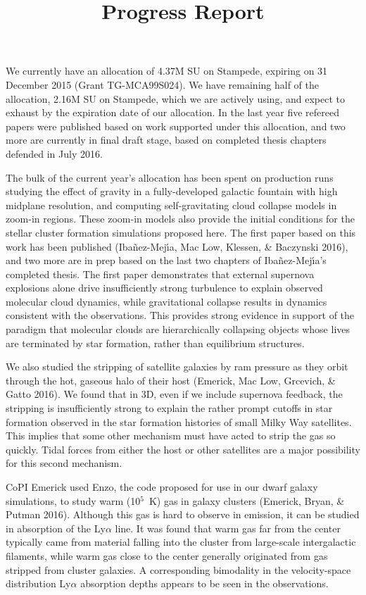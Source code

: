 \documentclass[11pt,preprint]{article}
\title{Progress Report}
\begin{document}
We currently have an allocation of 4.37M SU on Stampede, expiring on 31 December 2015 (Grant TG-MCA99S024).  We have remaining half of the allocation, 2.16M SU on Stampede, which we are actively using, and expect to exhaust by the expiration date of our allocation.  In the last year five refereed papers were published based on work supported under this allocation, and two more are currently in final draft stage, based on completed thesis chapters defended in July 2016.

The bulk of the current year's allocation has been spent on production runs studying the effect of gravity in a fully-developed galactic fountain with high midplane resolution, and computing self-gravitating cloud collapse models in zoom-in regions. These zoom-in models also provide the initial conditions for the stellar cluster formation simulations proposed here. The first paper based on this work has been published (Iba\~nez-Mej\'{\i}a, Mac Low, Klessen, \& Baczynski 2016), and two more are in prep based on the last two chapters of Iba\~nez-Mej\'{\i}a's completed thesis. The first paper demonstrates that external supernova explosions alone drive insufficiently strong turbulence to explain observed molecular cloud dynamics, while gravitational collapse results in dynamics consistent with the observations. This provides strong evidence in support of the paradigm that molecular clouds are hierarchically collapsing objects whose lives are terminated by star formation, rather than equilibrium structures.  

We also studied the stripping of satellite galaxies by ram pressure as they orbit through the hot, gaseous halo of their host (Emerick, Mac Low, Grcevich, \& Gatto 2016). We found that in 3D, even if we include supernova feedback, the stripping is insufficiently strong to explain the rather prompt cutoffs in star formation observed in the star formation histories of small Milky Way satellites.  This implies that some other mechanism must have acted to strip the gas so quickly. Tidal forces from either the host or other satellites are a major possibility for this second mechanism.

CoPI Emerick used Enzo, the code proposed for use in our dwarf galaxy simulations, to study warm (10$^5$~K) gas in galaxy clusters (Emerick, Bryan, \& Putman 2016).  Although this gas is hard to observe in emission, it can be studied in absorption of the Ly$\alpha$ line.  It was found that warm gas far from the center typically came from material falling into the cluster from large-scale intergalactic filaments, while warm gas close to the center generally originated from gas stripped from cluster galaxies.  A corresponding bimodality in the velocity-space distribution Ly$\alpha$ absorption depths appears to be seen in the observations.
\end{document}

